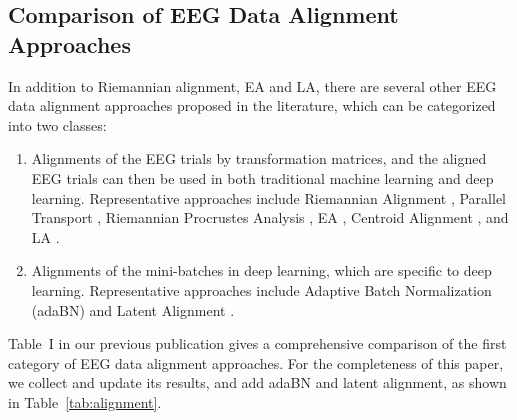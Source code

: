 \documentclass[journal]{IEEEtran}
\begin{document}
\subsection{Comparison of EEG Data Alignment Approaches}

In addition to Riemannian alignment, EA and LA, there are several other EEG data alignment approaches proposed in the literature,  which can be categorized into two classes:
\begin{enumerate}
\item Alignments of the EEG trials by transformation matrices, and the aligned EEG trials can then be used in both traditional machine learning and deep learning. Representative approaches include Riemannian  Alignment \cite{Zanini2018}, Parallel Transport \cite{Yair2019}, Riemannian Procrustes Analysis \cite{Rodrigues2019}, EA \cite{drwuEA2020}, Centroid Alignment \cite{drwuMEKT2020}, and LA \cite{drwuLA2020}.

\item Alignments of the mini-batches in deep learning, which are specific to deep learning. Representative approaches include Adaptive Batch Normalization (adaBN) \cite{JimenezGuarneros2020,Xu2021} and Latent Alignment \cite{Bakas2025}.
\end{enumerate}

Table~I in our previous publication \cite{drwuTLBCI2022} gives a comprehensive comparison of the first category of EEG data alignment approaches. For the completeness of this paper, we collect and update its results, and add adaBN and latent alignment, as shown in Table~\ref{tab:alignment}.
\end{document}
